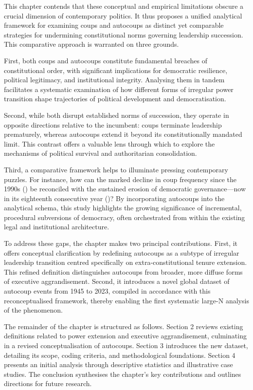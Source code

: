 \documentclass[
  12pt,
]{report}
\begin{document}
This chapter contends that these conceptual and empirical limitations
obscure a crucial dimension of contemporary politics. It thus proposes a
unified analytical framework for examining coups and autocoups as
distinct yet comparable strategies for undermining constitutional norms
governing leadership succession. This comparative approach is warranted
on three grounds.

First, both coups and autocoups constitute fundamental breaches of
constitutional order, with significant implications for democratic
resilience, political legitimacy, and institutional integrity. Analysing
them in tandem facilitates a systematic examination of how different
forms of irregular power transition shape trajectories of political
development and democratisation.

Second, while both disrupt established norms of succession, they operate
in opposite directions relative to the incumbent: coups terminate
leadership prematurely, whereas autocoups extend it beyond its
constitutionally mandated limit. This contrast offers a valuable lens
through which to explore the mechanisms of political survival and
authoritarian consolidation.

Third, a comparative framework helps to illuminate pressing contemporary
puzzles. For instance, how can the marked decline in coup frequency
since the 1990s () be reconciled
with the sustained erosion of democratic governance---now in its
eighteenth consecutive year
()? By
incorporating autocoups into the analytical schema, this study
highlights the growing significance of incremental, procedural
subversions of democracy, often orchestrated from within the existing
legal and institutional architecture.

To address these gaps, the chapter makes two principal contributions.
First, it offers conceptual clarification by redefining autocoups as a
subtype of irregular leadership transition centred specifically on
extra-constitutional tenure extension. This refined definition
distinguishes autocoups from broader, more diffuse forms of executive
aggrandisement. Second, it introduces a novel global dataset of autocoup
events from 1945 to 2023, compiled in accordance with this
reconceptualised framework, thereby enabling the first systematic
large-N analysis of the phenomenon.

The remainder of the chapter is structured as follows. Section 2 reviews
existing definitions related to power extension and executive
aggrandisement, culminating in a revised conceptualisation of autocoups.
Section 3 introduces the new dataset, detailing its scope, coding
criteria, and methodological foundations. Section 4 presents an initial
analysis through descriptive statistics and illustrative case studies.
The conclusion synthesises the chapter's key contributions and outlines
directions for future research.
\end{document}
